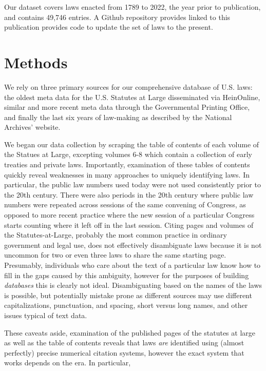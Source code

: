 \documentclass[fleqn,10pt]{wlscirep}
\begin{document}
 Our dataset covers laws enacted from 1789 to 2022, the year prior to publication, and contains 49,746 entries. A Github repository provides linked to this publication provides code to update the set of laws to the present.


\section*{Methods}

We rely on three primary sources for our comprehensive database of U.S. laws: the oldest meta data for the U.S. Statutes at Large disseminated via HeinOnline, similar and more recent meta data through the Governmental Printing Office, and finally the last six years of law-making as described by the National Archives' website.

We began our data collection by scraping the table of contents of each volume of the Statues at Large, excepting volumes 6-8 which contain a collection of early treaties and private laws. Importantly, examination of these tables of contents quickly reveal weaknesses in many approaches to uniquely identifying laws. In particular, the public law numbers used today were not used consistently prior to the 20th century. There were also periods in the 20th century where public law numbers were repeated across sessions of the same convening of Congress, as opposed to more recent practice where the new session of a particular Congress starts counting where it left off in the last session. Citing pages and volumes of the Statutes-at-Large, probably the most common practice in ordinary government and legal use, does not effectively disambiguate laws because it is not uncommon for two or even three laws to share the same starting page. Presumably, individuals who care about the text of a particular law know how to fill in the gaps caused by this ambiguity, however for the purposes of building \textit{databases} this is clearly not ideal. Disambiguating based on the names of the laws is possible, but potentially mistake prone as different sources may use different capitalizations, punctuation, and spacing, short versus long names, and other issues typical of text data. 

These caveats aside, examination of the published pages of the statutes at large as well as the table of contents reveals that laws \textit{are} identified using (almost perfectly) precise numerical citation systems, however the exact system that works depends on the era. In particular,
\end{document}
